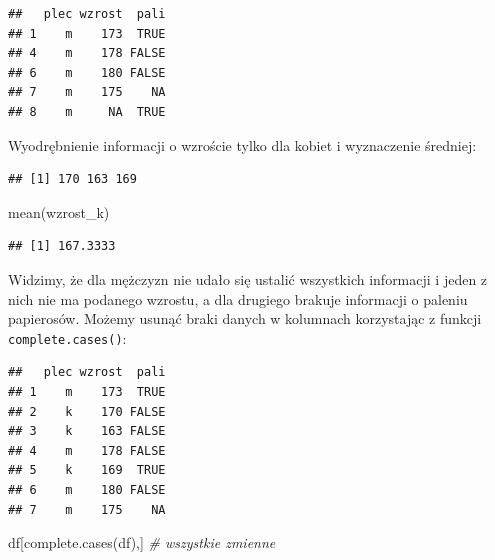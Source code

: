 \documentclass[
]{book}
\newenvironment{Shaded}{\begin{snugshade}}{\end{snugshade}}
\newcommand{\CommentTok}[1]{\textcolor[rgb]{0.56,0.35,0.01}{\textit{#1}}}
\newcommand{\FunctionTok}[1]{\textcolor[rgb]{0.00,0.00,0.00}{#1}}
\newcommand{\NormalTok}[1]{#1}
\newcommand{\OtherTok}[1]{\textcolor[rgb]{0.56,0.35,0.01}{#1}}
\newcommand{\SpecialCharTok}[1]{\textcolor[rgb]{0.00,0.00,0.00}{#1}}
\newcommand{\StringTok}[1]{\textcolor[rgb]{0.31,0.60,0.02}{#1}}
\begin{document}
\begin{verbatim}
##   plec wzrost  pali
## 1    m    173  TRUE
## 4    m    178 FALSE
## 6    m    180 FALSE
## 7    m    175    NA
## 8    m     NA  TRUE
\end{verbatim}

Wyodrębnienie informacji o wzroście tylko dla kobiet i wyznaczenie średniej:

\begin{Shaded}
\end{Shaded}

\begin{verbatim}
## [1] 170 163 169
\end{verbatim}

\begin{Shaded}
\begin{Highlighting}[]
\FunctionTok{mean}\NormalTok{(wzrost\_k)}
\end{Highlighting}
\end{Shaded}

\begin{verbatim}
## [1] 167.3333
\end{verbatim}

Widzimy, że dla mężczyzn nie udało się ustalić wszystkich informacji i jeden z nich nie ma podanego wzrostu, a dla drugiego brakuje informacji o paleniu papierosów. Możemy usunąć braki danych w kolumnach korzystając z funkcji \texttt{complete.cases()}:

\begin{Shaded}
\end{Shaded}

\begin{verbatim}
##   plec wzrost  pali
## 1    m    173  TRUE
## 2    k    170 FALSE
## 3    k    163 FALSE
## 4    m    178 FALSE
## 5    k    169  TRUE
## 6    m    180 FALSE
## 7    m    175    NA
\end{verbatim}

\begin{Shaded}
\begin{Highlighting}[]
\NormalTok{df[}\FunctionTok{complete.cases}\NormalTok{(df),] }\CommentTok{\# wszystkie zmienne}
\end{Highlighting}
\end{Shaded}
\end{document}
